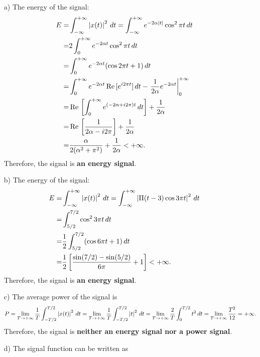 \documentclass{assignment}
\begin{document}
\begin{sol}
    \begin{itemize}
        \item[a)] The energy of the signal:
        \begin{align}
            \notag E=&\int_{-\infty}^{+\infty}\left\lvert x(t)\right\rvert^2\,dt=\int_{-\infty}^{+\infty}e^{-2\alpha\left\lvert t\right\rvert}\cos^2\pi t\,dt\\
            \notag=&2\int_0^{+\infty}e^{-2\alpha t}\cos^2\pi t\,dt\\
            \notag=&\int_0^{+\infty}e^{-2\alpha t}(\cos 2\pi t+1)\,dt\\
            \notag=&\int_0^{+\infty}e^{-2\alpha t}\,\text{Re}\,[e^{i2\pi t}]\,dt-\left.\frac{1}{2\alpha}e^{-2\alpha t}\right\lvert_{0}^{+\infty}\\
            \notag=&\,\text{Re}\,\left[\int_0^{+\infty}e^{(-2\alpha+i2\pi)t}\,dt\right]+\frac{1}{2\alpha}\\
            \notag=&\,\text{Re}\,\left[\frac{1}{2\alpha-i2\pi}\right]+\frac{1}{2\alpha}\\
            =&\frac{\alpha}{2(\alpha^2+\pi^2)}+\frac{1}{2\alpha}<+\infty.
        \end{align}
        Therefore, the signal is \textbf{an energy signal}.
        \item[b)] The energy of the signal:
        \begin{align}
            \notag E=&\int_{-\infty}^{+\infty}\left\lvert x(t)\right\rvert^2\,dt=\int_{-\infty}^{+\infty}\left\lvert\Pi(t-3)\cos 3\pi t\right\rvert^2\,dt\\
            \notag=&\int_{5/2}^{7/2}\cos^23\pi t\,dt\\
            \notag=&\frac{1}{2}\int_{5/2}^{7/2}(\cos 6\pi t+1)\,dt\\
            \notag=&\frac{1}{2}\left[\frac{\sin(7/2)-\sin(5/2)}{6\pi}+1\right]<+\infty.
        \end{align}
        Therefore, the signal is \textbf{an energy signal}.
        \item[c)] The average power of the signal is
        \begin{align}
            P=\lim_{T\rightarrow+\infty}\frac{1}{T}\int_{-T/2}^{T/2}\left\lvert x(t)\right\rvert^2\,dt=\lim_{T\rightarrow+\infty}\frac{1}{T}\int_{-T/2}^{T/2}\left\lvert t\right\rvert^2\,dt=\lim_{T\rightarrow+\infty}\frac{2}{T}\int_0^{T/2}t^2\,dt=\lim_{T\rightarrow+\infty}\frac{T^2}{12}=+\infty.
        \end{align}
        Therefore, the signal is \textbf{neither an energy signal nor a power signal}.
        \item[d)] The signal function can be written as

\end{itemize}
\end{sol}
\end{document}
